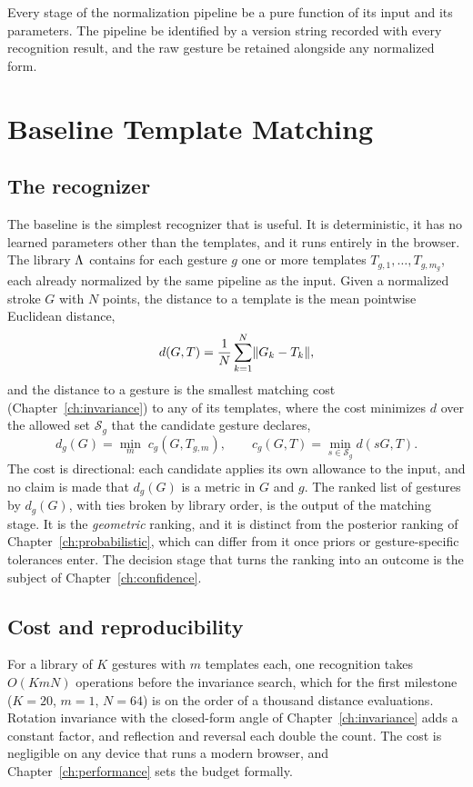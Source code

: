 \begin{requirement}\label{req:pipeline-version}
Every stage of the normalization pipeline \must{} be a pure function of its input and its parameters. The pipeline \must{} be identified by a version string recorded with every recognition result, and the raw gesture \must{} be retained alongside any normalized form.\evS
\end{requirement}

\chapter{Baseline Template Matching}\label{ch:template-matching}

\section{The recognizer}

The baseline is the simplest recognizer that is useful. It is deterministic, it has no learned parameters other than the templates, and it runs entirely in the browser. The library $\Lambda$ contains for each gesture $g$ one or more templates $T_{g,1},\dots,T_{g,m_g}$, each already normalized by the same pipeline as the input. Given a normalized stroke $G$ with $N$ points, the distance to a template is the mean pointwise Euclidean distance,
\[
d(G,T)=\frac1N\sum_{k=1}^{N}\lVert G_k-T_k\rVert,
\]
and the distance to a gesture is the smallest matching cost (Chapter~\ref{ch:invariance}) to any of its templates, where the cost minimizes $d$ over the allowed set $\mathcal S_g$ that the candidate gesture declares,
\[
d_g(G)=\min_{m}\;c_g(G,T_{g,m}),\qquad c_g(G,T)=\min_{s\in\mathcal S_g}d(sG,T).
\]
The cost is directional: each candidate applies its own allowance to the input, and no claim is made that $d_g(G)$ is a metric in $G$ and $g$. The ranked list of gestures by $d_g(G)$, with ties broken by library order, is the output of the matching stage. It is the \emph{geometric} ranking, and it is distinct from the posterior ranking of Chapter~\ref{ch:probabilistic}, which can differ from it once priors or gesture-specific tolerances enter. The decision stage that turns the ranking into an outcome is the subject of Chapter~\ref{ch:confidence}.

\section{Cost and reproducibility}

For a library of $K$ gestures with $m$ templates each, one recognition takes $O(KmN)$ operations before the invariance search, which for the first milestone ($K=20$, $m=1$, $N=64$) is on the order of a thousand distance evaluations. Rotation invariance with the closed-form angle of Chapter~\ref{ch:invariance} adds a constant factor, and reflection and reversal each double the count. The cost is negligible on any device that runs a modern browser, and Chapter~\ref{ch:performance} sets the budget formally.


